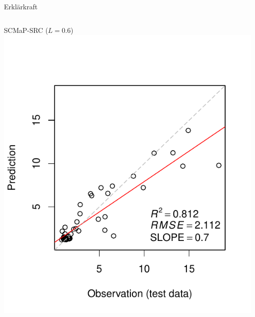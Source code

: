 \begin{frame}{Erklärkraft}
\begin{columns}
\begin{block}{\alert{SCMaP-SRC} ($L=0.6$)}
\centering\includegraphics[width=1\textwidth]{FIGURE/Figure_Model_Accuracy_SM_L06.pdf}
\end{block}
\end{columns}
\end{frame}


